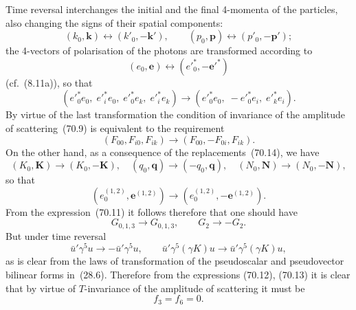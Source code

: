 Time reversal interchanges the initial and the final 4-momenta of the particles, also changing the signs of their spatial components:
\begin{equation}
(k_0, \mathbf{k}) \leftrightarrow (k'_0, -\mathbf{k}'),\qquad (p_0, \mathbf{p}) \leftrightarrow (p'_0, -\mathbf{p}');
\tag{70.14}
\end{equation}
the 4-vectors of polarisation of the photons are transformed according to
\begin{equation}
(e_0, \mathbf{e}) \leftrightarrow (e'^*_0, -\mathbf{e}'^*)
\tag{70.15}
\end{equation}
(cf.~(8.11a)), so that
\[
(e'^*_0 e_0,\; e'^*_i e_0,\; e'^*_0 e_k,\; e'^*_i e_k) \to (e'^*_0 e_0,\; -e'^*_0 e_i,\; e'^*_k e_i).
\]
By virtue of the last transformation the condition of invariance of the amplitude of scattering~(70.9) is equivalent to the requirement
\[
(F_{00}, F_{i0}, F_{ik}) \to (F_{00}, -F_{0i}, F_{ik}).
\]
On the other hand, as a consequence of the replacements~(70.14), we have
\[
(K_0, \mathbf{K}) \to (K_0, -\mathbf{K}),\quad (q_0, \mathbf{q}) \to (-q_0, \mathbf{q}),\quad (N_0, \mathbf{N}) \to (N_0, -\mathbf{N}),
\]
so that
\begin{equation}
(e^{(1,2)}_0, \mathbf{e}^{(1,2)}) \to (e^{(1,2)}_0, -\mathbf{e}^{(1,2)}).
\tag{70.16}
\end{equation}
From the expression~(70.11) it follows therefore that one should have
\[
G_{0,1,3} \to G_{0,1,3},\qquad G_2 \to -G_2.
\]
But under time reversal
\[
\bar{u}'\gamma^5 u \to -\bar{u}'\gamma^5 u,\qquad \bar{u}'\gamma^5(\gamma K)u \to \bar{u}'\gamma^5(\gamma K)u,
\]
as is clear from the laws of transformation of the pseudoscalar and pseudovector bilinear forms in~(28.6). Therefore from the expressions (70.12), (70.13) it is clear that by virtue of $T$-invariance of the amplitude of scattering it must be
\begin{equation}
f_3 = f_6 = 0.
\tag{70.17}
\end{equation}

